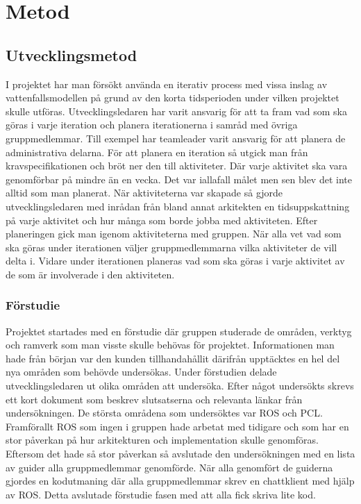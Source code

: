 \chapter{Metod}
\label{cha:method}

\section{Utvecklingsmetod}

I projektet har man försökt använda en iterativ process med vissa inslag av vattenfallsmodellen på grund av den korta tidsperioden under vilken projektet skulle utföras. Utvecklingsledaren har varit ansvarig för att ta fram vad som ska göras i varje iteration och planera iterationerna i samråd med övriga gruppmedlemmar. Till exempel har teamleader varit ansvarig för att planera de administrativa delarna. För att planera en iteration så utgick man från kravspecifikationen och bröt ner den till aktiviteter. Där varje aktivitet ska vara genomförbar på mindre än en vecka. Det var iallafall målet men sen blev det inte alltid som man planerat. När aktiviteterna var skapade så gjorde utvecklingsledaren med inrådan från bland annat arkitekten en tidsuppskattning på varje aktivitet och hur många som borde jobba med aktiviteten. Efter planeringen gick man igenom aktiviteterna med gruppen. När alla vet vad som ska göras under iterationen väljer gruppmedlemmarna vilka aktiviteter de vill delta i. Vidare under iterationen planeras vad som ska göras i varje aktivitet av de som är involverade i den aktiviteten.

\subsection{Förstudie}

Projektet startades med en förstudie där gruppen studerade de områden, verktyg och ramverk som man visste skulle behövas för projektet. Informationen man hade från början var den kunden tillhandahållit därifrån upptäcktes en hel del nya områden som behövde undersökas. Under förstudien delade utvecklingsledaren ut olika områden att undersöka. Efter något undersökts skrevs ett kort dokument som beskrev slutsatserna och relevanta länkar från undersökningen. De största områdena som undersöktes var ROS och PCL. Framförallt ROS som ingen i gruppen hade arbetat med tidigare och som har en stor påverkan på hur arkitekturen och implementation skulle genomföras. Eftersom det hade så stor påverkan så avslutade den undersökningen med en lista av guider alla gruppmedlemmar genomförde. När alla genomfört de guiderna gjordes en kodutmaning där alla gruppmedlemmar skrev en chattklient med hjälp av ROS. Detta avslutade förstudie fasen med att alla fick skriva lite kod. 

